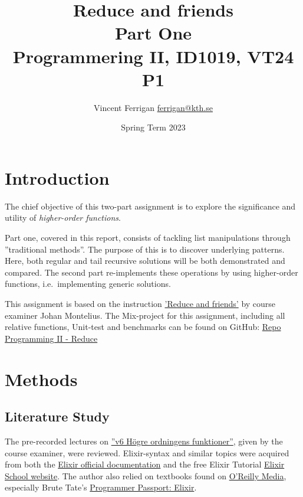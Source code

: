 \documentclass[a4paper,11pt]{article}
\begin{document}
\title{
    Reduce and friends
    \\Part One
\\\small{Programmering II, ID1019, VT24 P1}
}
\author{Vincent Ferrigan \href{mailto:ferrigan@kth.se}{ferrigan@kth.se}}

\date{Spring Term 2023}

\maketitle

\section*{Introduction}
\label{sec:introduction}
The chief objective of this two-part assignment is to explore the significance and utility
of \emph{higher-order functions}.

Part one, covered in this report, consists of tackling list manipulations through
''traditional methods''.
The purpose of this is to discover underlying patterns.
Here, both regular and tail recursive solutions will be both
demonstrated and compared.
The second part re-implements these operations by using higher-order functions,
i.e.\ implementing generic solutions.
%

This assignment is based on the instruction
\href{https://people.kth.se/~johanmon/courses/id1019/seminars/reduce/reduce.pdf}{'Reduce and friends'}
by course examiner Johan Montelius.
The Mix-project for this assignment, including all relative functions, Unit-test and benchmarks can be found on GitHub:
\href{https://github.com/VincentFerrigan/kth-id1019-programming-ii/tree/main/tasks/4/reduce}{Repo Programming II - Reduce}%
\section*{Methods}
\label{sec:methods}
\subsection*{Literature Study}
\label{subsec:literaturestudy}
The pre-recorded lectures on
\href{https://canvas.kth.se/courses/44911/assignments/syllabus}{''v6 Högre ordningens funktioner''},
given by the course examiner, were reviewed.
Elixir-syntax and similar topics were acquired
from both the
\href{https://elixir-lang.org/docs.html}{Elixir official documentation}
and the free Elixir Tutorial
\href{https://elixirschool.com/en}{Elixir School
website}.
The author also relied on textbooks found on
\href{https://learning.oreilly.com}{O'Reilly Media},
especially Brute Tate's
\href{https://learning.oreilly.com/library/view/programmer-passport-elixir/9781680509649/}{Programmer Passport: Elixir}.
\end{document}
